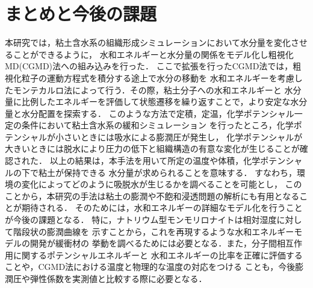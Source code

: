 ﻿\documentclass[11pt,a4j]{jarticle}
\begin{document}
\section{まとめと今後の課題}
本研究では，粘土含水系の組織形成シミュレーションにおいて水分量を変化させることができるように，
水和エネルギーと水分量の関係をモデル化し粗視化MD(CGMD)法への組み込みを行った．
ここで拡張を行ったCGMD法では，粗視化粒子の運動方程式を積分する途上で水分の移動を
水和エネルギーを考慮したモンテカルロ法によって行う．その際，粘土分子への水和エネルギーと
水分量に比例したエネルギーを評価して状態遷移を繰り返すことで，より安定な水分量と水分配置を探索する．
このような方法で定積，定温，化学ポテンシャル一定の条件において粘土含水系の緩和シミュレーション
を行ったところ，化学ポテンシャルが小さいときには吸水による膨潤圧が発生し，
化学ポテンシャルが大きいときには脱水により圧力の低下と組織構造の有意な変化が生じることが確認された．
以上の結果は，本手法を用いて所定の温度や体積，化学ポテンシャルの下で粘土が保持できる
水分量が求められることを意味する．
すなわち，環境の変化によってどのように吸脱水が生じるかを調べることを可能とし，
このことから，本研究の手法は粘土の膨潤や不飽和浸透問題の解析にも有用となることが期待される．
そのためには，水和エネルギーの詳細なモデル化を行うことが今後の課題となる．
特に，ナトリウム型モンモリロナイトは相対湿度に対して階段状の膨潤曲線を
示すことから，これを再現するような水和エネルギーモデルの開発が緩衝材の
挙動を調べるためには必要となる．また，分子間相互作用に関するポテンシャルエネルギーと
水和エネルギーの比率を正確に評価することや，CGMD法における温度と物理的な温度の対応をつける
ことも，今後膨潤圧や弾性係数を実測値と比較する際に必要となる．
%
\end{document}
